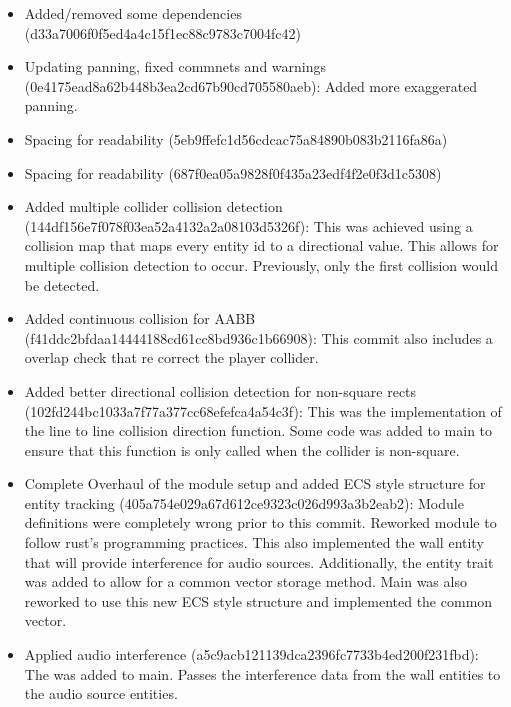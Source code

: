 \documentclass{article}
\begin{document}
\begin{itemize}
    \item Added/removed some dependencies (d33a7006f0f5ed4a4c15f1ec88c9783c7004fc42)

    \item Updating panning, fixed commnets and warnings \\ (0e4175ead8a62b448b3ea2cd67b90cd705580aeb): Added more exaggerated panning.

    \item Spacing for readability (5eb9ffefc1d56cdcac75a84890b083b2116fa86a)

    \item Spacing for readability (687f0ea05a9828f0f435a23edf4f2e0f3d1c5308)

    \item Added multiple collider collision detection (144df156e7f078f03ea52a4132a2a08103d5326f): This was achieved using a collision map that maps every entity id to a directional value. This allows for multiple collision detection to occur. Previously, only the first collision would be detected.

    \item Added continuous collision for AABB (f41ddc2bfdaa14444188cd61cc8bd936c1b66908): This commit also includes a overlap check that re correct the player collider.

    \item Added better directional collision detection for non-square rects \\ (102fd244bc1033a7f77a377cc68efefca4a54c3f): This was the implementation of the line to line collision direction function. Some code was added to main to ensure that this function is only called when the collider is non-square.

    \item Complete Overhaul of the module setup and added ECS style structure for entity tracking (405a754e029a67d612ce9323c026d993a3b2eab2): Module definitions were completely wrong prior to this commit. Reworked module to follow rust's programming practices. This also implemented the wall entity that will provide interference for audio sources. Additionally, the entity trait was added to allow for a common vector storage method. Main was also reworked to use this new ECS style structure and implemented the common vector.

    \item Applied audio interference (a5c9acb121139dca2396fc7733b4ed200f231fbd): The was added to main. Passes the interference data from the wall entities to the audio source entities.


\end{itemize}
\end{document}
